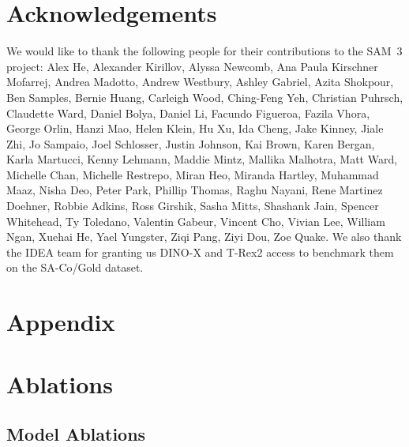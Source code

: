 \documentclass[]{fairmeta}
\newcommand{\model}{SAM~3\xspace}
\newcommand{\dsname}{{SA-Co}\xspace}
\newcommand{\evalgold}{{\dsname/Gold}\xspace}
\begin{document}
\section{Acknowledgements}
\begin{small}
    
We would like to thank the following people for their contributions to the \model project:
Alex He, Alexander Kirillov, Alyssa Newcomb, Ana Paula Kirschner Mofarrej, Andrea Madotto, Andrew Westbury, Ashley Gabriel, Azita Shokpour, Ben Samples, Bernie Huang, Carleigh Wood, Ching-Feng Yeh, Christian Puhrsch, Claudette Ward, Daniel Bolya, Daniel Li, Facundo Figueroa, Fazila Vhora, George Orlin, Hanzi Mao, Helen Klein, Hu Xu, Ida Cheng, Jake Kinney, Jiale Zhi, Jo Sampaio, Joel Schlosser, Justin Johnson, Kai Brown, Karen Bergan, Karla Martucci, Kenny Lehmann, Maddie Mintz, Mallika Malhotra, Matt Ward, Michelle Chan, Michelle Restrepo, Miran Heo, Miranda Hartley, Muhammad Maaz, Nisha Deo, Peter Park, Phillip Thomas, Raghu Nayani, Rene Martinez Doehner, Robbie Adkins, Ross Girshik, Sasha Mitts, Shashank Jain, Spencer Whitehead, Ty Toledano, Valentin Gabeur, Vincent Cho, Vivian Lee, William Ngan, Xuehai He, Yael Yungster, Ziqi Pang, Ziyi Dou, Zoe Quake.
We also thank the IDEA team for granting us DINO-X and T-Rex2 access to benchmark them on the \evalgold dataset.














\end{small}


	
	
	\appendix
	
	\section*{Appendix}\label{sec:appendix}
	\startcontents[sections]
	


\section{Ablations}
\label{app:sec:ablations}

\subsection{Model Ablations}
\label{app:sec:model_ablations}
\end{document}
